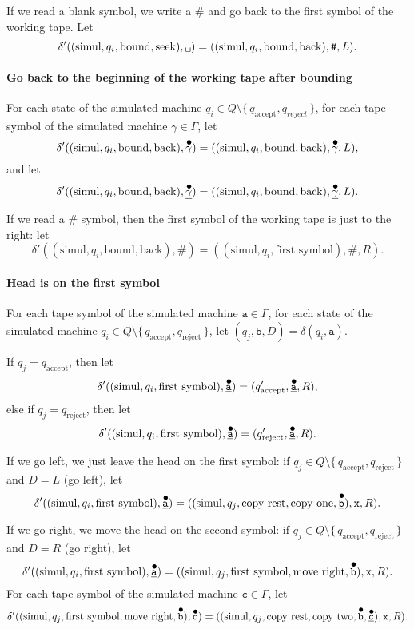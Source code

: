 \documentclass{article}
\newcommand\obullet[1]{\ThisStyle{\ensurestackMath{%
  \stackon[1pt]{\SavedStyle#1}{\SavedStyle\kern.6\LMpt\bullet}}}}
\newcommand{\0}{\texttt{\textvisiblespace}}
\newcommand{\°}{\obullet{\0}}
\newcommand{\Q}{\obullet{\w}}
\renewcommand{\C}{\obullet{\y}}
\newcommand{\HA}{\obullet{\underline{\s}}}
\newcommand{\HQ}{\obullet{\underline{\w}}}
\newcommand{\HC}{\obullet{\underline{\y}}}
\newcommand{\s}{\texttt{a}}
\newcommand{\w}{\texttt{b}}
\newcommand{\y}{\texttt{c}}
\newcommand{\X}{\texttt{x}}
\newcommand{\e}{\texttt{\#}}
\newcommand{\qa}{q_\text{accept}}
\newcommand{\qr}{q_\text{reject}}
\newcommand{\qpa}{q'_\text{accept}}
\newcommand{\qpr}{q'_\text{reject}}
\newcommand{\qwar}{Q\setminus\{\,\qa,\qr\,\}}
\begin{document}
If we read a blank symbol, we write a $\e$ and go back to the first symbol
of the working tape.
Let $$\delta'((\text{simul}, q_i, \text{bound}, \text{seek}),\0{})=((\text{simul},
q_i, \text{bound}, \text{back}),\e,L).$$

\paragraph{Go back to the beginning of the working tape after bounding}
For each state of the simulated machine $q_i \in Q \setminus
\{\,q_\text{accept},q_{reject}\,\}$,
for each tape symbol of the simulated machine $\gamma \in \Gamma$,
let $$\delta'((\text{simul}, q_i, \text{bound}, \text{back}),\obullet{\gamma})=((\text{simul},
q_i, \text{bound}, \text{back}),\obullet{\gamma},L),$$
and
let $$\delta'((\text{simul}, q_i, \text{bound}, \text{back}),\underline{\obullet{\gamma}})=((\text{simul},
q_i, \text{bound}, \text{back}),\underline{\obullet{\gamma}},L).$$

If we read a $\e$ symbol, then the first symbol of the working tape is just to
the right:
let $$\delta'((\text{simul}, q_i, \text{bound}, \text{back}),\e{})=((\text{simul},
q_i, \text{first symbol}),\e,R).$$

\paragraph{Head is on the first symbol}
For each tape symbol of the simulated machine $\s \in \Gamma$,
for each state of the simulated machine $q_i \in \qwar$,
let $(q_j, \w, D)=\delta(q_i,\s)$.

If $q_j = q_\text{accept}$, then
let $$\delta'((\text{simul}, q_i, \text{first symbol}),\HA)
=(\qpa,\HA, R),$$
else if $q_j = q_\text{reject}$, then
let $$\delta'((\text{simul}, q_i, \text{first symbol}),\HA)
=(\qpr,\HA, R).$$

If we go left, we just leave the head on the
first symbol:
if $q_j \in \qwar$ and $D=L$ (go left),
let $$\delta'((\text{simul}, q_i, \text{first symbol}),\HA)=((\text{simul},
q_j, \text{copy rest}, \text{copy one}, \HQ),\X,R).$$

If we go right, we move the head on the second symbol:
if $q_j \in \qwar$ and $D=R$ (go right),
let $$\delta'((\text{simul}, q_i, \text{first symbol}),\HA)=((\text{simul},
q_j, \text{first symbol}, \text{move right}, \Q),\X,R).$$
For each tape symbol of the simulated machine $\y \in \Gamma$,
let $$\delta'((\text{simul}, q_j, \text{first symbol}, \text{move right}, \Q), \C)=
((\text{simul}, q_j, \text{copy rest}, \text{copy two}, \Q, \HC),\X,R).$$
\end{document}
